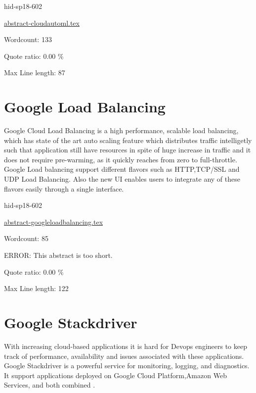 \begin{IU}

hid-sp18-602

\href{https://github.com/cloudmesh-community/hid-sp18-602/blob/master//technology/abstract-cloudautoml.tex}{abstract-cloudautoml.tex}

 

Wordcount: 133


Quote ratio: 0.00 \%
 
Max Line length: 87
\end{IU}

\section{Google Load Balancing}

Google Cloud Load Balancing is a high performance, scalable load balancing, 
which has state of the art auto scaling feature which distributes traffic 
intelligetly such that application still have resources in spite of huge increase 
in traffic and it does not require pre-warming, as it quickly reaches 
from zero to full-throttle. 
Google Load balancing support different flavors such as HTTP,TCP/SSL and UDP 
Load Balancing\cite{hid-sp18-602-www-loadbalancing-main}. Also the new UI enables users to integrate any of these flavors 
easily through a single interface.



\begin{IU}

hid-sp18-602

\href{https://github.com/cloudmesh-community/hid-sp18-602/blob/master//technology/abstract-googleloadbalancing.tex}{abstract-googleloadbalancing.tex}

 

Wordcount: 85

ERROR: This abstract is too short.


Quote ratio: 0.00 \%
 
Max Line length: 122
\end{IU}

\section{Google Stackdriver}

With increasing cloud-based applications it is hard for Devops engineers to keep
track of performance, availability and issues associated with these applications.
Google Stackdriver is a powerful service for monitoring, logging, and diagnostics. 
It support applications deployed on Google Cloud Platform,Amazon Web Services, and both combined
\cite{hid-sp18-602-www-google-stackdriver-main}.

